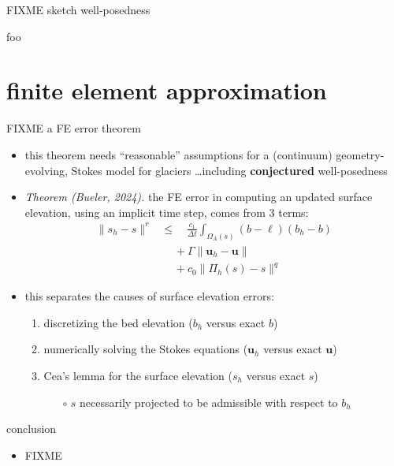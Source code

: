 \documentclass[10pt,dvipsnames]{beamer}
\newcommand{\bu}{\mathbf{u}}
\begin{document}
\begin{frame}{FIXME sketch well-posedness}

foo
\end{frame}


\section{finite element approximation}

\begin{frame}{FIXME a FE error theorem}

\begin{itemize}
\item this theorem needs ``reasonable'' assumptions for a (continuum) geometry-evolving, Stokes model for glaciers \dots including \textbf{conjectured} well-posedness
\item \emph{Theorem (Bueler, 2024).}  the FE error in computing an updated surface elevation, using an implicit time step, comes from 3 terms:
\begin{align*}
\|s_h-s\|^r &\le \quad \frac{c_1}{\Delta t} \int_{\Omega_A(s)} (b - \ell) (b_h - b) \\
   &\quad\, + \Gamma \big\|\bu_h - \bu\big\| \\
   &\quad\, + c_0 \|\Pi_h(s) - s\|^q
\end{align*}
\item this separates the causes of surface elevation errors:
    \begin{enumerate}
    \item discretizing the bed elevation ($b_h$ versus exact $b$)
    \item numerically solving the Stokes equations ($\bu_h$ versus exact $\bu$)
    \item Cea's lemma for the surface elevation ($s_h$ versus exact $s$) \strut
        \begin{itemize}
        \item[$\circ$] $s$ necessarily projected to be admissible with respect to $b_h$
        \end{itemize}
    \end{enumerate}
\end{itemize}
\end{frame}


\begin{frame}{conclusion}

\begin{itemize}
\item FIXME
\end{itemize}
\end{frame}
\end{document}
